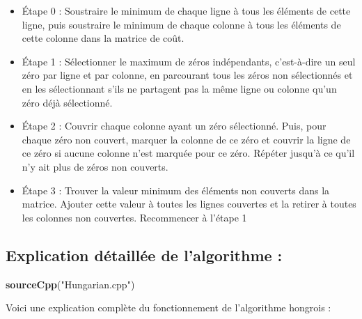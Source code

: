 \documentclass[
]{article}
\newenvironment{Shaded}{\begin{snugshade}}{\end{snugshade}}
\newcommand{\FunctionTok}[1]{\textcolor[rgb]{0.13,0.29,0.53}{\textbf{#1}}}
\newcommand{\NormalTok}[1]{#1}
\newcommand{\StringTok}[1]{\textcolor[rgb]{0.31,0.60,0.02}{#1}}
\providecommand{\tightlist}{%
  \setlength{\itemsep}{0pt}\setlength{\parskip}{0pt}}
\begin{document}
\begin{itemize}
\tightlist
\item
  Étape 0 : Soustraire le minimum de chaque ligne à tous les éléments de
  cette ligne, puis soustraire le minimum de chaque colonne à tous les
  éléments de cette colonne dans la matrice de coût.
\end{itemize}

\begin{itemize}
\tightlist
\item
  Étape 1 : Sélectionner le maximum de zéros indépendants, c'est-à-dire
  un seul zéro par ligne et par colonne, en parcourant tous les zéros
  non sélectionnés et en les sélectionnant s'ils ne partagent pas la
  même ligne ou colonne qu'un zéro déjà sélectionné.
\end{itemize}

\begin{itemize}
\tightlist
\item
  Étape 2 : Couvrir chaque colonne ayant un zéro sélectionné. Puis, pour
  chaque zéro non couvert, marquer la colonne de ce zéro et couvrir la
  ligne de ce zéro si aucune colonne n'est marquée pour ce zéro. Répéter
  jusqu'à ce qu'il n'y ait plus de zéros non couverts.
\end{itemize}

\begin{itemize}
\tightlist
\item
  Étape 3 : Trouver la valeur minimum des éléments non couverts dans la
  matrice. Ajouter cette valeur à toutes les lignes couvertes et la
  retirer à toutes les colonnes non couvertes. Recommencer à l'étape 1
\end{itemize}

\hypertarget{explication-duxe9tailluxe9e-de-lalgorithme-1}{%
\subsection{Explication détaillée de l'algorithme
:}\label{explication-duxe9tailluxe9e-de-lalgorithme-1}}

\begin{Shaded}
\begin{Highlighting}[]
\FunctionTok{sourceCpp}\NormalTok{(}\StringTok{"Hungarian.cpp"}\NormalTok{)}
\end{Highlighting}
\end{Shaded}

Voici une explication complète du fonctionnement de l'algorithme
hongrois :
\end{document}
